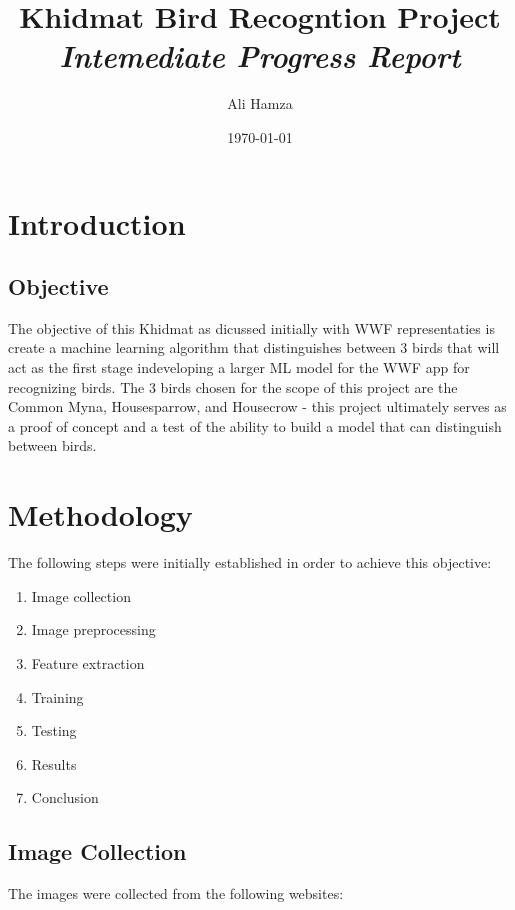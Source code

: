 \documentclass{article}
\title{Khidmat Bird Recogntion Project\\ \textit{Intemediate Progress Report}}
\author{Ali Hamza}
\date{\today}
\begin{document}
    \maketitle
    \section*{Introduction}
    \subsection*{Objective}
    The objective of this Khidmat as dicussed initially with WWF representaties is create a machine learning algorithm that distinguishes between 3 birds that will act as the first stage indeveloping a larger ML model for the WWF app for recognizing birds. The 3 birds chosen for the scope of this project are the Common Myna, Housesparrow, and Housecrow - this project ultimately serves as a proof of concept and a test of the ability to build a model that can distinguish between birds.

    \section*{Methodology}
    The following steps were initially established in order to achieve this objective:
    
    \begin{enumerate}
        \item Image collection
        \item Image preprocessing
        \item Feature extraction
        \item Training
        \item Testing
        \item Results
        \item Conclusion
    \end{enumerate}

    \subsection*{Image Collection}
    The images were collected from the following websites:
    
\end{document}
